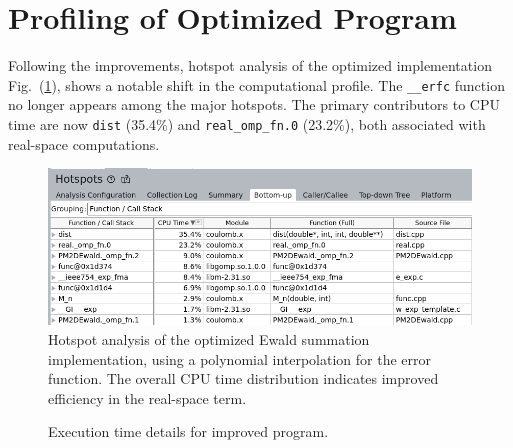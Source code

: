 \section{Profiling of Optimized Program}
Following the improvements, hotspot analysis of the optimized implementation Fig.~(\ref{fig:resultVTuneFinal}), shows a notable shift in the computational profile. The \texttt{\_\_erfc} function no longer appears among the major hotspots. The primary contributors to CPU time are now \texttt{dist} (35.4\%) and \texttt{real\_omp\_fn.0} (23.2\%), both associated with real-space computations.  %
\begin{figure}[htbp]
    \centering
    \includegraphics[width = \linewidth]{images/VTuneFinalHotSpots.png}
    \caption{Hotspot analysis of the optimized Ewald summation implementation, using a polynomial interpolation for the error function. The overall CPU time distribution indicates improved efficiency in the real-space term.}
    \label{fig:resultVTuneFinal}
\end{figure}
\begin{figure}[h]
    \centering
    \begin{minipage}{0.7\textwidth}
    \end{minipage}%
    \begin{minipage}{0.3\textwidth}
        \caption{Execution time details for improved program.}
    \end{minipage}
\end{figure}

